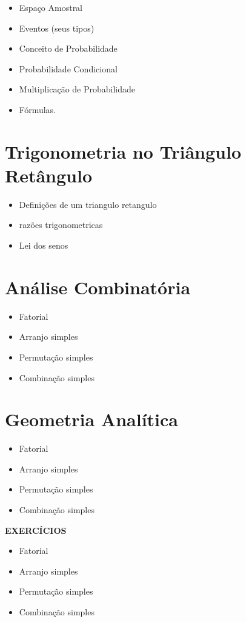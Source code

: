 \documentclass[11pt,fleqn]{book}
\begin{document}
	\begin{itemize}
		\item Espaço Amostral
		\item Eventos (seus tipos)
		\item Conceito de Probabilidade
		\item Probabilidade Condicional
		\item Multiplicação de Probabilidade
		\item Fórmulas.
	\end{itemize}

\section{Trigonometria no Triângulo Retângulo}

	\begin{itemize}
		\item   Definições de um triangulo retangulo
		\item razões trigonometricas
		\item Lei dos senos
	\end{itemize}

\section{Análise Combinatória}%

	\begin{itemize}
		\item Fatorial
		\item Arranjo simples
		\item Permutação simples
		\item Combinação simples
	\end{itemize}

\section{Geometria Analítica}%
	\begin{itemize}
		\item Fatorial
		\item Arranjo simples
		\item Permutação simples
		\item Combinação simples
	\end{itemize}

	\begin{center}
		\textbf{EXERCÍCIOS}
	\end{center}

	\begin{itemize}
		\item Fatorial
		\item Arranjo simples
		\item Permutação simples
		\item Combinação simples
	\end{itemize}
\end{document}
